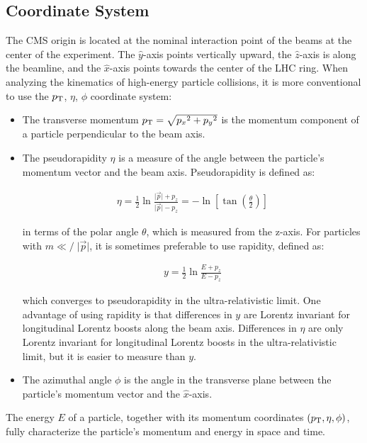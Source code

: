 \subsection{Coordinate System}
\label{CMS_Coordinate_System}
The CMS origin is located at the nominal interaction point of the beams at the center of the experiment.
The $\hat{y}$-axis points vertically upward, the $\hat{z}$-axis is along the beamline, and the $\hat{x}$-axis points towards the center of the LHC ring.
When analyzing the kinematics of high-energy particle collisions, it is more conventional to use the $p_{\mathrm{T}}$, $\eta$, $\phi$ coordinate system:
\begin{itemize}
\item The transverse momentum $p_{\mathrm{T}} = \sqrt {{p_x}^2+{p_y}^2}$ is the momentum component of a particle perpendicular to the beam axis. 
\item The pseudorapidity $\eta$ is a measure of the angle between the particle's momentum vector and the beam axis.
Pseudorapidity is defined as: 
\begin{linenomath*}
\begin{align}
\eta=\frac{1}{2} \ln \frac{\vert\vec{p}\vert+p_z}{\vert\vec{p}\vert-p_z}=-\ln \left[\tan \left(\frac{\theta}{2}\right)\right]
\end{align}
\end{linenomath*}
in terms of the polar angle $\theta$, which is measured from the z-axis.
For particles with $m {{\ll}\!\!\!\!/} \; \vert \vec{p} \vert$, it is sometimes preferable to use rapidity, defined as:
\begin{linenomath*}
\begin{align}
y=\frac{1}{2} \ln \frac{E+p_z}{E-p_z}
\label{Rapidity}
\end{align}
\end{linenomath*}
which converges to pseudorapidity in the ultra-relativistic limit.
One advantage of using rapidity is that differences in $y$ are Lorentz invariant for longitudinal Lorentz boosts along the beam axis.
Differences in $\eta$ are only Lorentz invariant for longitudinal Lorentz boosts in the ultra-relativistic limit, but it is easier to measure than $y$.
\item The azimuthal angle $\phi$ is the angle in the transverse plane between the particle's momentum vector and the $\hat{x}$-axis.
\end{itemize}
The energy $E$ of a particle, together with its momentum coordinates $( p_{\mathrm{T}}, \eta, \phi )$, fully characterize the particle's momentum and energy in space and time.

